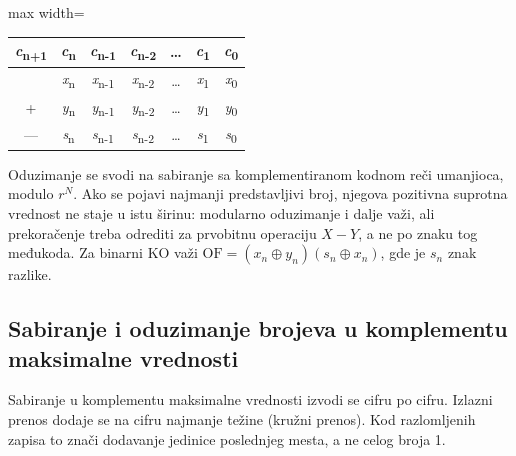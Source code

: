 \documentclass[a4paper,11pt]{article}
\numberwithin{equation}{section}
\newcommand{\redlinija}{\arrayrulecolor{black!28}\specialrule{0.3pt}{2pt}{2pt}\arrayrulecolor{black}}
\begin{document}
\begin{center}\begin{adjustbox}{max width=\linewidth}
\begin{tabular}{ccccccc}\toprule
\emph{c}\textsubscript{n+1} & \emph{c}\textsubscript{n} & \emph{c}\textsubscript{n-1} & \emph{c}\textsubscript{n-2} & \ldots{} & \emph{c}\textsubscript{1} & \emph{c}\textsubscript{0} \\
\midrule
 & \emph{x}\textsubscript{n} & \emph{x}\textsubscript{n-1} & \emph{x}\textsubscript{n-2} & \ldots{} & \emph{x}\textsubscript{1} & \emph{x}\textsubscript{0} \\
\redlinija
+ & \emph{y}\textsubscript{n} & \emph{y}\textsubscript{n-1} & \emph{y}\textsubscript{n-2} & \ldots{} & \emph{y}\textsubscript{1} & \emph{y}\textsubscript{0} \\
\redlinija
--- & \emph{s}\textsubscript{n} & \emph{s}\textsubscript{n-1} & \emph{s}\textsubscript{n-2} & \ldots{} & \emph{s}\textsubscript{1} & \emph{s}\textsubscript{0} \\
\bottomrule\end{tabular}\end{adjustbox}\end{center}


Oduzimanje se svodi na sabiranje sa komplementiranom kodnom reči umanjioca, modulo $r^N$. Ako se pojavi najmanji predstavljivi broj, njegova pozitivna suprotna vrednost ne staje u istu širinu: modularno oduzimanje i dalje važi, ali prekoračenje treba odrediti za prvobitnu operaciju $X-Y$, a ne po znaku tog međukoda. Za binarni KO važi $\mathrm{OF}=(x_n\oplus y_n)(s_n\oplus x_n)$, gde je $s_n$ znak razlike.



\FloatBarrier
\subsection{Sabiranje i oduzimanje brojeva u komplementu maksimalne vrednosti}\label{sec:1.4}


Sabiranje u komplementu maksimalne vrednosti izvodi se cifru po cifru. Izlazni prenos dodaje se na cifru najmanje težine (kružni prenos). Kod razlomljenih zapisa to znači dodavanje jedinice poslednjeg mesta, a ne celog broja 1.
\end{document}
